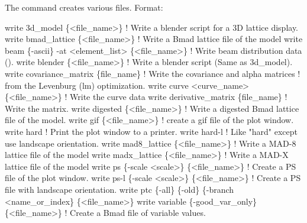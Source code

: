 {{{{{{The  command creates various files.
Format:
\begin{example}
  write 3d_model \{<file_name>\}           ! Write a blender script for a 3D lattice display.
  write bmad_lattice \{<file_name>\}       ! Write a Bmad lattice file of the model
  write beam \{-ascii\} -at <element_list> \{<file_name>\} 
                                         ! Write beam distribution data ().
  write blender \{<file_name>\}            ! Write a blender script (Same as 3d_model).
  write covariance_matrix \{file_name\}    ! Write the covariance and alpha matrices 
                                         !   from the Levenburg (lm) optimization.
  write curve <curve_name> \{<file_name>\} ! Write the curve data
  write derivative_matrix \{file_name\}    ! Write the  matrix.
  write digested \{<file_name>\}     ! Write a digested Bmad lattice file of the model.
  write gif \{<file_name>\}          ! create a gif file of the plot window.
  write hard                       ! Print the plot window to a printer.
  write hard-l                     ! Like "hard" except use landscape orientation. 
  write mad8_lattice \{<file_name>\} ! Write a MAD-8 lattice file of the model
  write madx_lattice \{<file_name>\} ! Write a MAD-X lattice file of the model
  write ps \{-scale <scale>\} \{<file_name>\}      
                                   ! Create a PS file of the plot window.
  write ps-l \{-scale <scale>\} \{<file_name>\}    
                                   ! Create a PS file with landscape orientation.
  write ptc \{-all\} \{-old\} \{-branch <name_or_index\} \{<file_name>\}
  write variable \{-good_var_only\} \{<file_name>\} 
                                   ! Create a Bmad file of variable values.
\end{example}

\vskip 7pt 

}}}}}}
